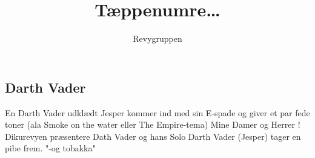 \documentclass[danish]{article}
\title{Tæppenumre\ldots}
\author{Revygruppen}
\begin{document}
\maketitle

\begin{sketch}

\subsection*{Darth Vader}
\scene En Darth Vader udklædt Jesper kommer ind med sin E-spade og giver et par 
fede toner (ala Smoke on the water eller The Empire-tema)
 Mine Damer og Herrer ! Dikurevyen præsentere Dath Vader og hans Solo
\scene Darth Vader (Jesper) tager en pibe frem.
 "-og tobakka"

\end{sketch}
\end{document}
